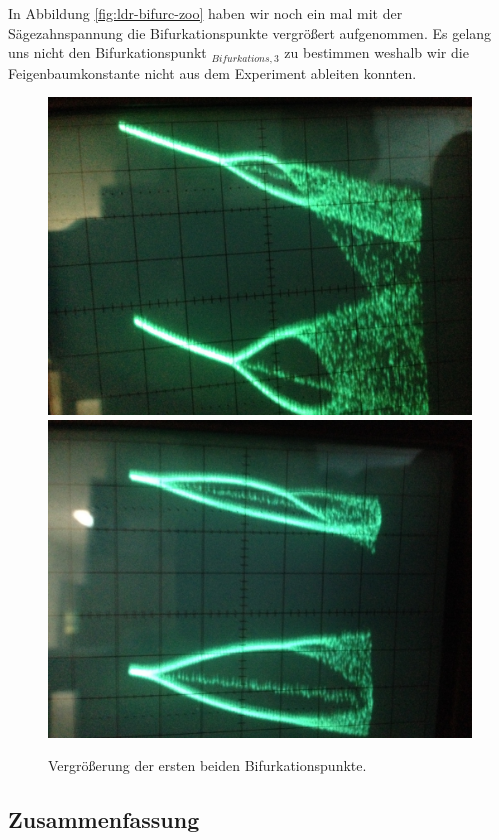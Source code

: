 \documentclass{scrartcl}
\begin{document}
In Abbildung \ref{fig:ldr-bifurc-zoo} haben wir noch ein mal mit der Sägezahnspannung die Bifurkationspunkte vergrößert aufgenommen. Es gelang uns nicht den Bifurkationspunkt $_{Bifurkations, 3}$ zu bestimmen weshalb wir die Feigenbaumkonstante nicht aus dem Experiment ableiten konnten.

\begin{figure}[!htbp]
\centering
\includegraphics[scale=0.18]{bif-ldr/bifurc-zoom}
\includegraphics[scale=0.18]{bif-ldr/bifurc-zoom2}
\caption{Vergrößerung der ersten beiden Bifurkationspunkte.}
\label{fig:ldr-bifurc-zoom}
\end{figure}


\subsection { Zusammenfassung }
\end{document}
